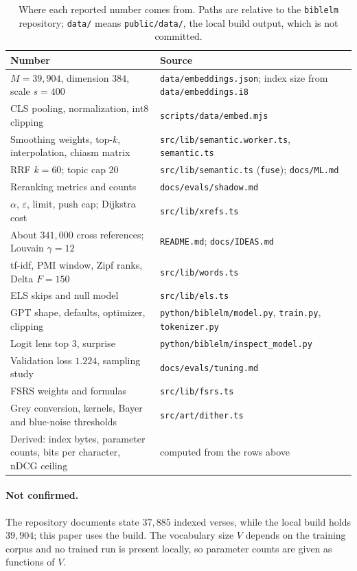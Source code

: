 \documentclass[11pt]{article}
\newcommand{\code}[1]{\texttt{#1}}
\begin{document}
\begin{table}[htbp]
\centering
\caption{Where each reported number comes from. Paths are relative to the
\code{biblelm} repository; \code{data/} means \code{public/data/}, the local
build output, which is not committed.}
\label{tab:provenance}
\small
\begin{tabular}{>{\raggedright\arraybackslash}p{} >{\raggedright\arraybackslash}p{}}
\toprule
Number & Source \\
\midrule
$M = 39{,}904$, dimension $384$, scale $s = 400$ & \code{data/embeddings.json}; index size from \code{data/embeddings.i8} \\
CLS pooling, normalization, int8 clipping & \code{scripts/data/embed.mjs} \\
Smoothing weights, top-$k$, interpolation, chiasm matrix & \code{src/lib/semantic.worker.ts}, \code{semantic.ts} \\
RRF $k = 60$; topic cap $20$ & \code{src/lib/semantic.ts} (\code{fuse}); \code{docs/ML.md} \\
Reranking metrics and counts & \code{docs/evals/shadow.md} \\
$\alpha$, $\varepsilon$, limit, push cap; Dijkstra cost & \code{src/lib/xrefs.ts} \\
About $341{,}000$ cross references; Louvain $\gamma = 12$ & \code{README.md}; \code{docs/IDEAS.md} \\
tf-idf, PMI window, Zipf ranks, Delta $F = 150$ & \code{src/lib/words.ts} \\
ELS skips and null model & \code{src/lib/els.ts} \\
GPT shape, defaults, optimizer, clipping & \code{python/biblelm/model.py}, \code{train.py}, \code{tokenizer.py} \\
Logit lens top $3$, surprise & \code{python/biblelm/inspect\_model.py} \\
Validation loss $1.224$, sampling study & \code{docs/evals/tuning.md} \\
FSRS weights and formulas & \code{src/lib/fsrs.ts} \\
Grey conversion, kernels, Bayer and blue-noise thresholds & \code{src/art/dither.ts} \\
Derived: index bytes, parameter counts, bits per character, nDCG ceiling & computed from the rows above \\
\bottomrule
\end{tabular}
\end{table}

\paragraph{Not confirmed.} The repository documents state $37{,}885$ indexed
verses, while the local build holds $39{,}904$; this paper uses the build. The
vocabulary size $V$ depends on the training corpus and no trained run is present
locally, so parameter counts are given as functions of $V$.
\end{document}

